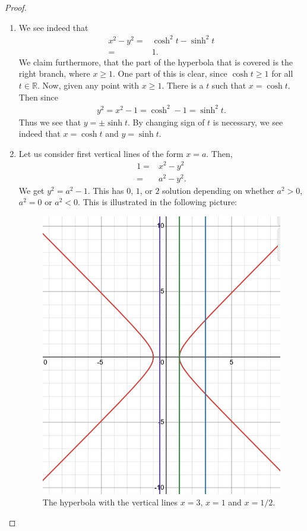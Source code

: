 \begin{proof}
    \begin{enumerate}
        \item We see indeed that
        \begin{align*}
            x^2 - y^2
            =& \cosh^2 t - \sinh^2 t\\
            =& 1.
        \end{align*}
        We claim furthermore, that the part of the hyperbola that is covered is the right branch, where $x\geq 1$. 
        One part of this is clear, since $\cosh t\geq 1$ for all $t\in \mathbb{R}$. 
        Now, given any point with $x\geq 1$. 
        There is a $t$ such that $x=\cosh t$. 
        Then since
        \begin{align*}
            y^2 = x^2 - 1 = \cosh^2 - 1 = \sinh^2 t.
        \end{align*}
        Thus we see that $y = \pm \sinh t$. 
        By changing sign of $t$ is necessary, we see indeed that $x=\cosh t$ and $y = \sinh t$.
        \item Let us consider first vertical lines of the form $x=a$. Then,
        \begin{align*}
            1
            = & x^2 - y^2\\
            = & a^2 - y^2.
        \end{align*}
        We get $y^2 = a^2 - 1$. 
        This has $0$, $1$, or $2$ solution depending on whether $a^2 > 0$, $a^2 = 0$ or $a^2 < 0$. 
        This is illustrated in the following picture:
        \begin{figure}[H]
            \centering
            \includegraphics[width=0.5\linewidth]{cox-little-oshea/ch1/assets/sec1-3-ex5b.png}
            \caption{The hyperbola with the vertical lines $x=3$, $x=1$ and $x=1/2$.}

\end{figure}
\end{enumerate}
\end{proof}
